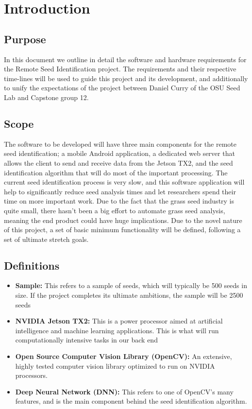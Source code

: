 \documentclass[onecolumn, draftclsnofoot,10pt, compsoc]{IEEEtran}
\begin{document}
\section{Introduction}
\subsection{Purpose}
In this document we outline in detail the software and hardware requirements for the Remote Seed Identification project. The requirements and their respective time-lines will be used to guide this project and its development, and additionally to unify the expectations of the project between Daniel Curry of the OSU Seed Lab and Capstone group 12. 

\subsection{Scope}
The software to be developed will have three main components for the remote seed identification; a mobile Android application, a dedicated web server that allows the client to send and receive data from the Jetson TX2, and the seed identification algorithm that will do most of the important processing. The current seed identification process is very slow, and this software application will help to significantly reduce seed analysis times and let researchers spend their time on more important work. Due to the fact that the grass seed industry is quite small, there hasn't been a big effort to automate grass seed analysis, meaning the end product could have huge implications. Due to the novel nature of this project, a set of basic minimum functionality will be defined, following a set of ultimate stretch goals.  
\subsection{Definitions}
\begin{itemize}
\item
\textbf{Sample: } This refers to a sample of seeds, which will typically be 500 seeds in size. If the project completes its ultimate ambitions, the sample will be 2500 seeds
\item
\textbf{NVIDIA Jetson TX2: } This is a power processor aimed at artificial intelligence and machine learning applications. This is what will run computationally intensive tasks in our back end
\item
\textbf{Open Source Computer Vision Library (OpenCV): } An extensive, highly tested computer vision library optimized to run on NVIDIA processors.
\item
\textbf{Deep Neural Network (DNN): } This refers to one of OpenCV's many features, and is the main component behind the seed identification algorithm.
\end{itemize}
\end{document}
